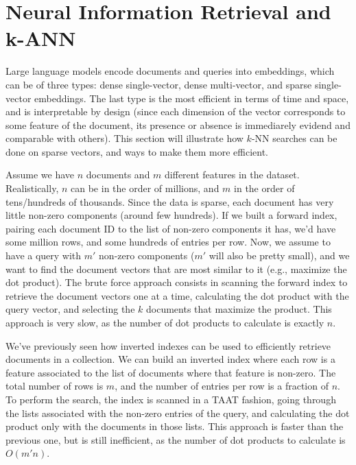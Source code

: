 \section{Neural Information Retrieval and k-ANN}

Large language models encode documents and queries into embeddings, which can be of three types: dense single-vector, dense multi-vector, and sparse single-vector embeddings. The last type is the most efficient in terms of time and space, and is interpretable by design (since each dimension of the vector corresponds to some feature of the document, its presence or absence is immediarely evidend and comparable with others). This section will illustrate how $k$-NN searches can be done on sparse vectors, and ways to make them more efficient.

Assume we have $n$ documents and $m$ different features in the dataset. Realistically, $n$ can be in the order of millions, and $m$ in the order of tens/hundreds of thousands. Since the data is sparse, each document has very little non-zero components (around few hundreds). If we built a forward index, pairing each document ID to the list of non-zero components it has, we'd have some million rows, and some hundreds of entries per row. Now, we assume to have a query with $m'$ non-zero components ($m'$ will also be pretty small), and we want to find the document vectors that are most similar to it (e.g., maximize the dot product). The brute force approach consists in scanning the forward index to retrieve the document vectors one at a time, calculating the dot product with the query vector, and selecting the $k$ documents that maximize the product. This approach is  very slow, as the number of dot products to calculate is exactly $n$.

We've previously seen how inverted indexes can be used to efficiently retrieve documents in a collection. We can build an inverted index where each row is a feature associated to the list of documents where that feature is non-zero. The total number of rows is $m$, and the number of entries per row is a fraction of $n$. To perform the search, the index is scanned in a TAAT fashion, going through the lists associated with the non-zero entries of the query, and calculating the dot product only with the documents in those lists. This approach is faster than the previous one, but is still inefficient, as the number of dot products to calculate is $O(m'n)$.

